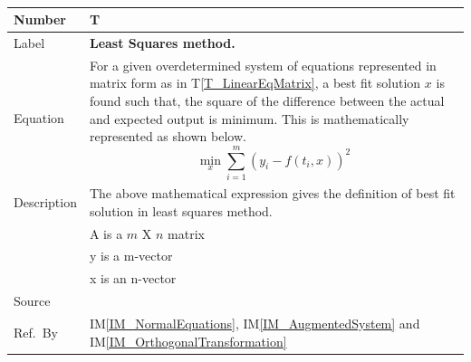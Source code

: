 \documentclass[12pt]{article}
\newcommand{\colAwidth}{0.13\textwidth}
\newcommand{\colBwidth}{0.82\textwidth}
\newcounter{theorynum} %
\newcommand{\tref}[1]{T\ref{#1}}
\newcommand{\iref}[1]{IM\ref{#1}}
\begin{document}
~\newline
\noindent
\begin{minipage}{\textwidth}
	\renewcommand*{\arraystretch}{1.5}
	\begin{tabular}{| p{\colAwidth} | p{\colBwidth}|}
		\hline
		\rowcolor[gray]{0.9}
		Number& T{theorynum}\thetheorynum \label{T_LeastSquares}\\
		\hline
		Label&\bf Least Squares method.\\
		\hline
		Equation& For a given overdetermined system of equations represented in 
		matrix form as in \tref{T_LinearEqMatrix}, a best fit solution $x$ is 
		found such that, the square of the difference between the actual and 
		expected output is minimum. This is mathematically represented as shown 
		below.
		\begin{equation*}
		\min_{x}\sum_{i=1}^{m} (y_i - f(t_i,x)) ^2
		\end{equation*} \\
		\hline
		Description & The above mathematical expression gives the definition of 
		best fit solution in least squares method.\\
		& A is a $m$ X $n$ matrix\\
		& y is a m-vector\\
		& x is an n-vector\\
		\hline
		Source & ~\cite{Health1997}\\
		
		\hline
		Ref.\ By &\iref{IM_NormalEquations}, \iref{IM_AugmentedSystem} and \iref{IM_OrthogonalTransformation}\\
		\hline
	\end{tabular}
\end{minipage}\\
~\newline

\end{document}
